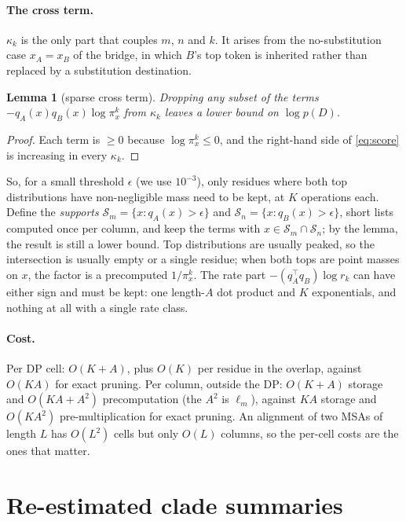 \documentclass[11pt]{article}
\newtheorem{lemma}{Lemma}
\begin{document}
\paragraph{The cross term.} $\kappa_k$ is the only part that couples $m$, $n$
and $k$. It arises from the no-substitution case $x_A=x_B$ of the bridge, in
which $B$'s top token is inherited rather than replaced by a substitution
destination.

\begin{lemma}[sparse cross term]\label{lem:sparse}
Dropping any subset of the terms $-q_A(x)q_B(x)\log\pi^k_x$ from $\kappa_k$
leaves a lower bound on $\log p(D)$.
\end{lemma}
\begin{proof}
Each term is $\ge0$ because $\log\pi^k_x\le0$, and the right-hand side of
\eqref{eq:score} is increasing in every $\kappa_k$.
\end{proof}

So, for a small threshold $\epsilon$ (we use $10^{-3}$), only residues where
both top distributions have non-negligible mass need to be kept, at $K$
operations each. Define the \emph{supports}
$\mathcal S_m=\{x:q_A(x)>\epsilon\}$ and $\mathcal S_n=\{x:q_B(x)>\epsilon\}$,
short lists computed once per column, and keep the terms with
$x\in\mathcal S_m\cap\mathcal S_n$; by the lemma, the result is still a lower
bound. Top distributions are usually peaked, so the intersection is
usually empty or a single
residue; when both tops are point masses on $x$, the factor is a precomputed
$1/\pi^k_x$. The rate part $-(q_A^\top q_B)\log r_k$ can have either sign and
must be kept: one length-$A$ dot product and $K$ exponentials, and nothing at
all with a single rate class.

\paragraph{Cost.} Per DP cell: $O(K+A)$, plus $O(K)$ per residue in the
overlap, against $O(KA)$ for exact pruning. Per column, outside the DP:
$O(K+A)$ storage and $O(KA+A^2)$ precomputation (the $A^2$ is $\ell_m$),
against $KA$ storage and $O(KA^2)$ pre-multiplication for exact pruning. An
alignment of two MSAs of length $L$ has $O(L^2)$ cells but only $O(L)$
columns, so the per-cell costs are the ones that matter.

\section{Re-estimated clade summaries}
\label{sec:reest}
\end{document}
